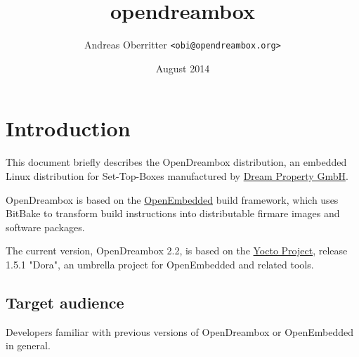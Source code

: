 \documentclass[a4paper]{article}
\newcommand{\shell}[1]{\texttt{\small #1}}
\begin{document}
\title{opendreambox}
\author{Andreas Oberritter \shell{<obi@opendreambox.org>}}
\date{August 2014}
\maketitle
\tableofcontents
\pagebreak

\section{Introduction}
  \begin{flushleft}
    This document briefly describes the OpenDreambox distribution, an embedded Linux
    distribution for Set-Top-Boxes manufactured by \href{http://www.dream-multimedia-tv.de/}{Dream Property GmbH}.

    OpenDreambox is based on the \href{http://www.openembedded.org/}{OpenEmbedded} build framework, which
    uses BitBake to transform build instructions into
    distributable firmare images and software packages.

    The current version, OpenDreambox 2.2, is based on the \href{https://www.yoctoproject.org/}{Yocto Project}, release 
    1.5.1 "Dora", an umbrella project for OpenEmbedded and related tools.
  \end{flushleft}

  \subsection{Target audience}
    \begin{flushleft}
      Developers familiar with previous versions of OpenDreambox or OpenEmbedded
      in general.
    \end{flushleft}
\end{document}
